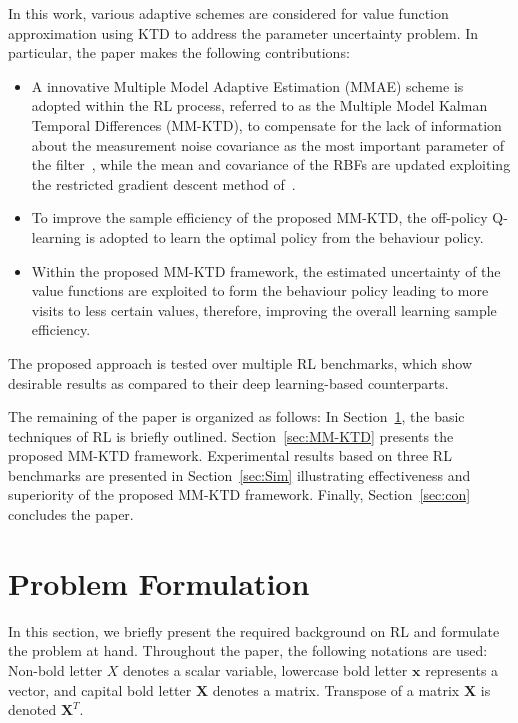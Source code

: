 \documentclass{ieeeaccess}
\def\MMK{\text{MM-KTD}}
\def\X{\bm{X}}
\def\x{\bm{x}}
\begin{document}
In this work, various adaptive schemes are considered for value function approximation using KTD to address the parameter uncertainty problem. In particular, the paper makes the following contributions:
%
\begin{itemize}
\item A innovative Multiple Model Adaptive Estimation (MMAE) scheme is adopted within the RL process, referred to as the Multiple Model Kalman Temporal Differences ($\MMK$), to compensate for the lack of information about the measurement noise covariance as the most important parameter of the filter~\cite{29}, while the mean and covariance of the RBFs are updated exploiting the restricted gradient descent method of~\cite{18}.
\item To improve the sample efficiency of the proposed $\MMK$, the off-policy Q-learning is adopted to learn the optimal policy from the behaviour policy.
\item Within the proposed $\MMK$ framework, the estimated uncertainty of the value functions are exploited to form the behaviour policy leading to more visits to less certain values, therefore, improving the overall learning sample efficiency.
\end{itemize}
%
The proposed approach is tested over multiple RL benchmarks, which show desirable results as compared to their deep learning-based counterparts.

The remaining of the paper is organized as follows: In Section~\ref{sec:PrbFor}, the basic techniques of RL is briefly outlined. Section~\ref{sec:MM-KTD} presents the proposed $\MMK$ framework. Experimental results based on three RL benchmarks are presented in Section~\ref{sec:Sim} illustrating effectiveness and superiority of the proposed $\MMK$ framework. Finally, Section~\ref{sec:con} concludes the paper.

\section{Problem Formulation} \label{sec:PrbFor}
In this section, we briefly present the required background on RL and formulate the problem at hand. Throughout the paper, the following notations are used: Non-bold letter $X$ denotes a scalar variable, lowercase bold letter $\x$ represents a vector, and capital bold letter $\X$ denotes a matrix. Transpose of a matrix $\X$  is denoted $\X^{T}$.
\end{document}
